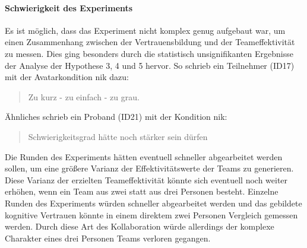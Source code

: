 \documentclass[a4paper,11pt]{article}%
\renewcommand{\\}{\vspace*{0.5\baselineskip} \newline}
\begin{document}
\paragraph{Schwierigkeit des Experiments}
\label{Schwierigkeit des Experiments}

Es ist möglich, dass das Experiment nicht komplex genug aufgebaut war, um einen Zusammenhang zwischen der Vertrauensbildung und der Teameffektivität zu messen. Dies ging besonders durch die statistisch unsignifikanten Ergebnisse der Analyse der Hypothese 3, 4 und 5 hervor. So schrieb ein Teilnehmer (ID17) mit der Avatarkondition \ac{nik} dazu:
\begin{quote}
\glqq{}Zu kurz - zu einfach - zu grau.\dq{}
\end{quote}
Ähnliches schrieb ein Proband (ID21) mit der Kondition \ac{nik}:
\begin{quote}
\glqq{}Schwierigkeitsgrad hätte noch stärker sein dürfen\dq{}
\end{quote}
Die Runden des Experiments hätten eventuell schneller abgearbeitet werden sollen, um eine größere Varianz der Effektivitätswerte der Teams zu generieren. Diese Varianz der erzielten Teameffektivität könnte sich eventuell noch weiter erhöhen, wenn ein Team aus zwei statt aus drei Personen besteht. Einzelne Runden des Experiments würden schneller abgearbeitet werden und das gebildete kognitive Vertrauen könnte in einem direktem zwei Personen Vergleich gemessen werden. Durch diese Art des Kollaboration würde allerdings der komplexe Charakter eines drei Personen Teams verloren gegangen.
\end{document}
